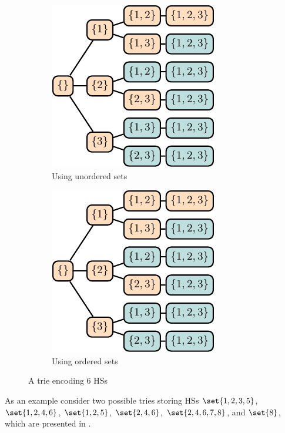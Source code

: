 \begin{figure}[!ht]
  \begin{subfigure}[b]{0.5\columnwidth}
    \centering
    \includegraphics[page=6]{figures/mhs2/figures/opts/main}
    \caption{Using unordered sets\label{fig:mhs2o:trieunordered}}
  \end{subfigure}%
  \begin{subfigure}[b]{0.5\columnwidth}
    \centering
    \includegraphics[page=5]{figures/mhs2/figures/opts/main}
    \caption{Using ordered sets\label{fig:mhs2o:trieordered}}
  \end{subfigure}%
  \caption{A trie encoding $6$ \acsp{HS}\label{fig:mhs2o:trie}}
\end{figure}

As an example consider two possible tries storing \acp{HS}
$\set{1,2,3,5}$, $\set{1,2,4,6}$, $\set{1,2,5}$, $\set{2,4,6}$,
$\set{2,4,6,7,8}$, and $\set{8}$, which are presented in
.
%



